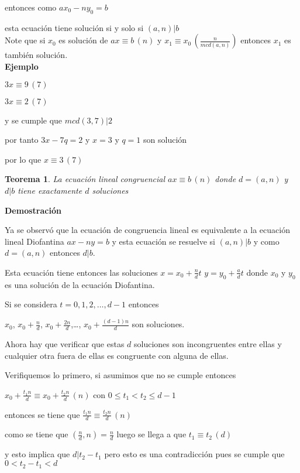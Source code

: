 \documentclass[a4paper,12pt]{report}
\newtheorem*{teo}{Teorema}
\begin{document}
entonces como $ax_0-ny_0=b$ 

esta ecuación tiene solución si y solo si $(a,n)|b$\\


Note que si $x_0$ es solución de  $ax\equiv b \, (n)$ y $x_1\equiv x_0\, (\frac{n}{mcd(a,n)})$ entonces $x_1$ es también solución.\\

\textbf{Ejemplo}

$3x\equiv 9\, (7)$

$3x\equiv 2\, (7)$

y se cumple que $mcd(3,7)|2$

por tanto $3x-7q=2$ y $x=3$ y $q=1$ son solución

por lo que $x\equiv 3\, (7)$



\begin{teo}
 La ecuación lineal congruencial $ax\equiv b \, (n)$ donde $d=(a,n)$ y $d|b$ tiene exactamente $d$ soluciones\\
\end{teo}



\textbf{Demostración}

Ya se observó que la ecuación de congruencia lineal es equivalente a la ecuación lineal Diofantina $ax-ny=b$ y esta ecuación se resuelve si $(a,n)|b$ y como $d=(a,n)$ entonces $d|b$.

Esta ecuación tiene entonces las soluciones $x=x_0 + \frac{n}{d}t$ $y=y_0 + \frac{a}{d}t$ donde $x_0$ y $y_0$ es una solución de la ecuación Diofantina.

Si se considera $t=0,1,2,\dots,d-1$ entonces 

$x_0$, $x_0 + \frac{n}{d}$, $x_0 + \frac{2n}{d}$,\dots, $x_0 + \frac{(d-1)n}{d}$ son soluciones.

Ahora hay que verificar que estas $d$ soluciones son incongruentes entre ellas y cualquier otra fuera de ellas es congruente con alguna de ellas.

Verifiquemos lo primero, si asumimos que no se cumple entonces 

$x_0 + \frac{t_1n}{d} \equiv x_0 + \frac{t_2n}{d} \, (n)$ con $0\leq t_1 < t_2 \leq d-1$

entonces se tiene que $\frac{t_1n}{d} \equiv \frac{t_2n}{d} \, (n)$

como se tiene que $(\frac{n}{d},n)=\frac{n}{d}$ luego se llega a que $t_1\equiv t_2 \, (d)$

y esto implica que $d|t_2-t_1$ pero esto es una contradicción pues se cumple que $0<t_2-t_1<d$
\end{document}
